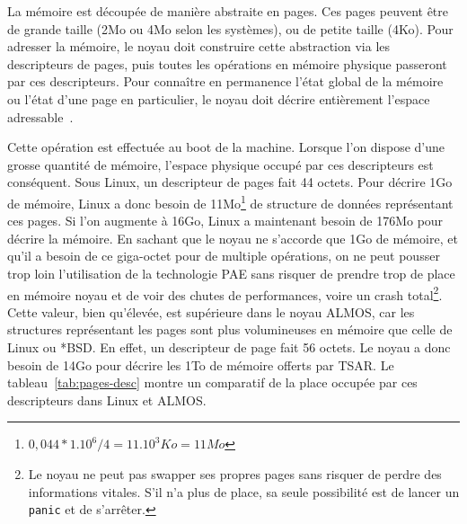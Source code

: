       La mémoire est découpée de manière abstraite en pages. Ces pages peuvent
      être de grande taille (2Mo ou 4Mo selon les systèmes), ou de petite taille
      (4Ko). Pour adresser la mémoire, le noyau doit construire cette
      abstraction via les descripteurs de pages, puis toutes les opérations en
      mémoire physique passeront par ces descripteurs. Pour connaître en
      permanence l'état global de la mémoire ou l'état d'une page en
      particulier, le noyau doit décrire entièrement l'espace
      adressable~\citep{cranor1999uvm, gorman2004understanding,
        russinovich2012windows, dillon2000design, steldt2009memory,
        steldtXXXXopenbsd}.

      Cette opération est effectuée au boot de la machine. Lorsque l’on dispose
      d’une grosse quantité de mémoire, l'espace physique occupé par ces
      descripteurs est conséquent. Sous Linux, un descripteur de pages fait 44
      octets. Pour décrire 1Go de mémoire, Linux a donc besoin de
      11Mo\footnote{$0,044*1.10^6/4 = 11.10^3Ko = 11Mo$} de structure de données
      représentant ces pages. Si l'on augmente à 16Go, Linux a maintenant besoin
      de 176Mo pour décrire la mémoire. En sachant que le noyau ne s'accorde que
      1Go de mémoire, et qu'il a besoin de ce giga-octet pour de multiple
      opérations, on ne peut pousser trop loin l'utilisation de la technologie
      PAE sans risquer de prendre trop de place en mémoire noyau et de voir des
      chutes de performances, voire un crash total\footnote{Le noyau ne peut pas
        swapper ses propres pages sans risquer de perdre des informations
        vitales. S'il n'a plus de place, sa seule possibilité est de lancer un
        \texttt{panic} et de s'arrêter.}. Cette valeur, bien qu’élevée, est
      supérieure dans le noyau ALMOS, car les structures représentant les pages
      sont plus volumineuses en mémoire que celle de Linux ou *BSD. En effet, un
      descripteur de page fait 56 octets. Le noyau a donc besoin de 14Go pour
      décrire les 1To de mémoire offerts par TSAR. Le
      tableau~\ref{tab:pages-desc} montre un comparatif de la place occupée par
      ces descripteurs dans Linux et ALMOS.

